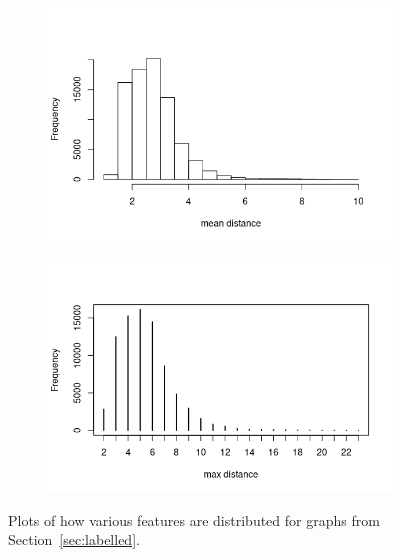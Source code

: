 \documentclass{l4proj}
\theoremstyle{definition}
\theoremstyle{remark}
\begin{document}
\begin{appendices}
\begin{figure}
\begin{subfigure}[t]{0.49\textwidth}
    \end{subfigure}
    \begin{subfigure}[t]{0.49\textwidth}
      \centering
      \includegraphics[width=\textwidth]{images/mcs_meandist.png}
    \end{subfigure}
    \begin{subfigure}[t]{0.49\textwidth}
      \centering
      \includegraphics[width=\textwidth]{images/mcs_maxdist.png}
    \end{subfigure}
    \caption{Plots of how various features are distributed for graphs from
      Section~\ref{sec:labelled}.}
    \label{fig:mcs_features1}
  \end{figure}


\end{appendices}
\end{document}
